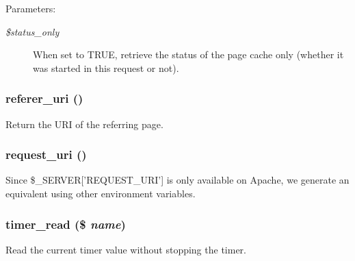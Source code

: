 \begin{Desc}
\item[Parameters:]
\begin{description}
\item[{\em \$status\_\-only}]When set to TRUE, retrieve the status of the page cache only (whether it was started in this request or not). \end{description}
\end{Desc}
\hypertarget{bootstrap_8inc_fbe92bfb1695e3710ae4136c6972be5c}{
\subsubsection[{referer\_\-uri}]{\setlength{\rightskip}{0pt plus 5cm}referer\_\-uri ()}}
\label{bootstrap_8inc_fbe92bfb1695e3710ae4136c6972be5c}


Return the URI of the referring page. \hypertarget{bootstrap_8inc_80b52d5331d840440b5e3dfe82dd7ea2}{
\subsubsection[{request\_\-uri}]{\setlength{\rightskip}{0pt plus 5cm}request\_\-uri ()}}
\label{bootstrap_8inc_80b52d5331d840440b5e3dfe82dd7ea2}


Since \$\_\-SERVER\mbox{[}'REQUEST\_\-URI'\mbox{]} is only available on Apache, we generate an equivalent using other environment variables. \hypertarget{bootstrap_8inc_d093007ebd04feb2a1394ff5774eb6d4}{
\subsubsection[{timer\_\-read}]{\setlength{\rightskip}{0pt plus 5cm}timer\_\-read (\$ {\em name})}}
\label{bootstrap_8inc_d093007ebd04feb2a1394ff5774eb6d4}


Read the current timer value without stopping the timer.

